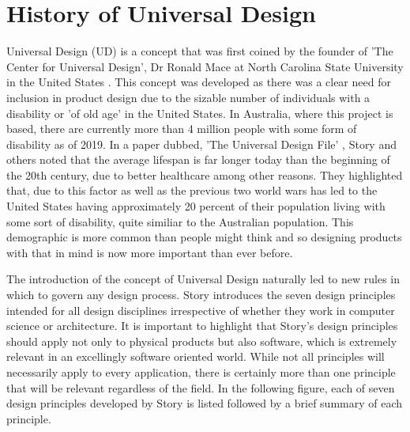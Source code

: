\section{History of Universal Design}
Universal Design (UD) is a concept that was first coined by the founder of 'The Center for Universal Design', Dr Ronald Mace at North Carolina State University in the United States \cite{ronald}.
This concept was developed as there was a clear need for inclusion in product design due to the sizable number of individuals with a disability or 'of old age' in the United States.
In Australia, where this project is based, there are currently more than 4 million people with some form of disability \cite{ausstats} as of 2019. 
In a paper dubbed, 'The Universal Design File' \cite{universalfile}, Story and others noted that the average lifespan is far longer today than the beginning of the 20th century, due to better healthcare among other reasons.
They highlighted that, due to this factor as well as the previous two world wars has led to the United States having approximately 20 percent of their population living with some sort of disability, quite similiar to the Australian population.
This demographic is more common than people might think and so designing products with that in mind is now more important than ever before.

The introduction of the concept of Universal Design naturally led to new rules in which to govern any design process. %
Story introduces the seven design principles \cite{sevenprinciples} intended for all design disciplines irrespective of whether they work in computer science or architecture.
It is important to highlight that Story's design principles should apply not only to physical products but also software, which is extremely relevant in an excellingly software oriented world.
While not all principles will necessarily apply to every application, there is certainly more than one principle that will be relevant regardless of the field.
In the following figure, each of seven design principles developed by Story is listed followed by a brief summary of each principle.

